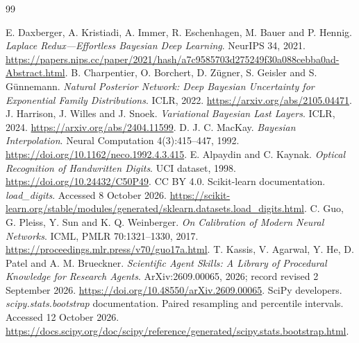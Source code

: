\documentclass[10pt,a4paper]{article}
\begin{document}
\begin{thebibliography}{99}\small\raggedright
{} E. Daxberger, A. Kristiadi, A. Immer, R. Eschenhagen,
M. Bauer and P. Hennig. \emph{Laplace Redux---Effortless Bayesian Deep Learning}.
NeurIPS 34, 2021.
\url{https://papers.nips.cc/paper/2021/hash/a7c9585703d275249f30a088cebba0ad-Abstract.html}.
 B. Charpentier, O. Borchert, D. Z\"ugner, S. Geisler and
S. G\"unnemann. \emph{Natural Posterior Network: Deep Bayesian Uncertainty for
Exponential Family Distributions}. ICLR, 2022.
\url{https://arxiv.org/abs/2105.04471}.
 J. Harrison, J. Willes and J. Snoek.
\emph{Variational Bayesian Last Layers}. ICLR, 2024.
\url{https://arxiv.org/abs/2404.11599}.
 D. J. C. MacKay. \emph{Bayesian Interpolation}.
Neural Computation 4(3):415--447, 1992.
\url{https://doi.org/10.1162/neco.1992.4.3.415}.
 E. Alpaydin and C. Kaynak.
\emph{Optical Recognition of Handwritten Digits}. UCI dataset, 1998.
\url{https://doi.org/10.24432/C50P49}. CC BY 4.0.
 Scikit-learn documentation. \emph{load\_digits}.
Accessed 8 October 2026.
\url{https://scikit-learn.org/stable/modules/generated/sklearn.datasets.load_digits.html}.
 C. Guo, G. Pleiss, Y. Sun and K. Q. Weinberger.
\emph{On Calibration of Modern Neural Networks}. ICML, PMLR 70:1321--1330, 2017.
\url{https://proceedings.mlr.press/v70/guo17a.html}.
 T. Kassis, V. Agarwal, Y. He, D. Patel and A. M. Brueckner.
\emph{Scientific Agent Skills: A Library of Procedural Knowledge for Research Agents}.
ArXiv:2609.00065, 2026; record revised 2 September 2026.
\url{https://doi.org/10.48550/arXiv.2609.00065}.
 SciPy developers. \emph{scipy.stats.bootstrap} documentation.
Paired resampling and percentile intervals. Accessed 12 October 2026.
\url{https://docs.scipy.org/doc/scipy/reference/generated/scipy.stats.bootstrap.html}.
\end{thebibliography}
\end{document}
